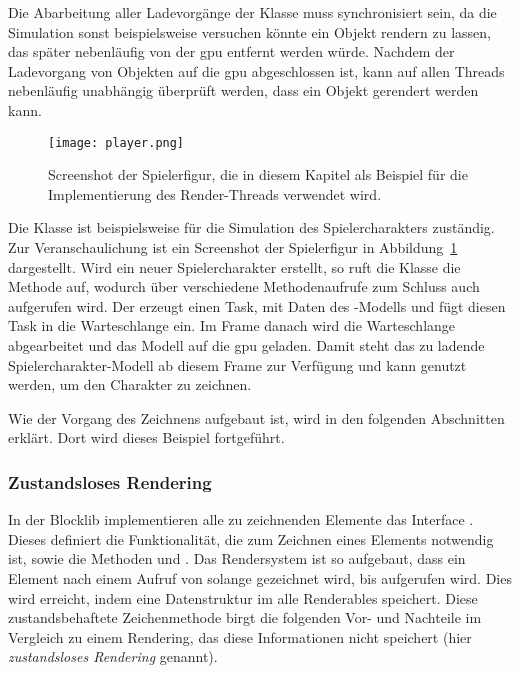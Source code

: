 Die Abarbeitung aller Ladevorgänge der Klasse  muss synchronisiert sein, da die Simulation sonst beispielsweise versuchen könnte ein Objekt rendern zu lassen, das später nebenläufig von der \ac{gpu} entfernt werden würde. Nachdem der Ladevorgang von Objekten auf die \ac{gpu} abgeschlossen ist, kann auf allen Threads nebenläufig unabhängig überprüft werden, dass ein Objekt gerendert werden kann.

\begin{figure}
	\centering
	\texttt{[image: player.png]}
	\caption[Screenshot der Spielerfigur in der Blocklib.]{Screenshot der Spielerfigur, die in diesem Kapitel als Beispiel für die Implementierung des Render-Threads verwendet wird.}\label{fig:player}
\end{figure}

\begin{leftrule}
	Die Klasse  ist beispielsweise für die Simulation des Spielercharakters zuständig. Zur Veranschaulichung ist ein Screenshot der Spielerfigur in Abbildung~\ref{fig:player} dargestellt. Wird ein neuer Spielercharakter erstellt, so ruft die Klasse  die Methode  auf, wodurch über verschiedene Methodenaufrufe zum Schluss auch  aufgerufen wird. Der  erzeugt einen Task, mit Daten des -Modells und fügt diesen Task in die Warteschlange ein. Im Frame danach wird die Warteschlange abgearbeitet und das Modell auf die \ac{gpu} geladen. Damit steht das zu ladende Spielercharakter-Modell ab diesem Frame zur Verfügung und kann genutzt werden, um den Charakter zu zeichnen. 
\end{leftrule}

Wie der Vorgang des Zeichnens aufgebaut ist, wird in den folgenden Abschnitten erklärt. Dort wird dieses Beispiel fortgeführt.

\subsubsection{Zustandsloses Rendering}\label{sec:statelessRendering}
In der Blocklib implementieren alle zu zeichnenden Elemente das Interface . Dieses definiert die Funktionalität, die zum Zeichnen eines Elements notwendig ist, sowie die Methoden  und . Das Rendersystem ist so aufgebaut, dass ein Element nach einem Aufruf von  solange gezeichnet wird, bis  aufgerufen wird. Dies wird erreicht, indem eine Datenstruktur im  alle Renderables speichert. Diese zustandsbehaftete Zeichenmethode birgt die folgenden Vor- und Nachteile im Vergleich zu einem Rendering, das diese Informationen nicht speichert (hier \emph{zustandsloses Rendering} genannt).

